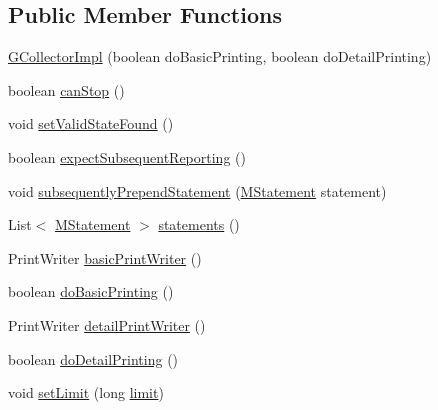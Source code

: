 \subsection*{Public Member Functions}
\begin{DoxyCompactItemize}
\item 
\hyperlink{classorg_1_1tzi_1_1use_1_1gen_1_1tool_1_1_g_collector_impl_a543fa2285c99b149a3c024f5f76da29e}{G\-Collector\-Impl} (boolean do\-Basic\-Printing, boolean do\-Detail\-Printing)
\item 
boolean \hyperlink{classorg_1_1tzi_1_1use_1_1gen_1_1tool_1_1_g_collector_impl_a067c60dd71ba25e508d2b4e5567487fb}{can\-Stop} ()
\item 
void \hyperlink{classorg_1_1tzi_1_1use_1_1gen_1_1tool_1_1_g_collector_impl_ab190695bb90c99d60105c8c1d056e79e}{set\-Valid\-State\-Found} ()
\item 
boolean \hyperlink{classorg_1_1tzi_1_1use_1_1gen_1_1tool_1_1_g_collector_impl_a7ef0f7ec17b42c28d9e9beb425f81bef}{expect\-Subsequent\-Reporting} ()
\item 
void \hyperlink{classorg_1_1tzi_1_1use_1_1gen_1_1tool_1_1_g_collector_impl_af86d89b5fb0fc1557deeada439c799ac}{subsequently\-Prepend\-Statement} (\hyperlink{classorg_1_1tzi_1_1use_1_1uml_1_1sys_1_1soil_1_1_m_statement}{M\-Statement} statement)
\item 
List$<$ \hyperlink{classorg_1_1tzi_1_1use_1_1uml_1_1sys_1_1soil_1_1_m_statement}{M\-Statement} $>$ \hyperlink{classorg_1_1tzi_1_1use_1_1gen_1_1tool_1_1_g_collector_impl_a03dffa5335b9c587bad70f7623d73d8d}{statements} ()
\item 
Print\-Writer \hyperlink{classorg_1_1tzi_1_1use_1_1gen_1_1tool_1_1_g_collector_impl_a961cac6117b3493f91884d4e524182c2}{basic\-Print\-Writer} ()
\item 
boolean \hyperlink{classorg_1_1tzi_1_1use_1_1gen_1_1tool_1_1_g_collector_impl_ab7c5fef0ca5d17d8d199dc3a71e98d69}{do\-Basic\-Printing} ()
\item 
Print\-Writer \hyperlink{classorg_1_1tzi_1_1use_1_1gen_1_1tool_1_1_g_collector_impl_a5a192e01ea279f334d1f7db62423767c}{detail\-Print\-Writer} ()
\item 
boolean \hyperlink{classorg_1_1tzi_1_1use_1_1gen_1_1tool_1_1_g_collector_impl_a8072492c93e5865c55fafcf59c9481df}{do\-Detail\-Printing} ()
\item 
void \hyperlink{classorg_1_1tzi_1_1use_1_1gen_1_1tool_1_1_g_collector_impl_a9d98bbfbfeac4fb021dc7b9b15c9ba61}{set\-Limit} (long \hyperlink{classorg_1_1tzi_1_1use_1_1gen_1_1tool_1_1_g_collector_impl_afda25f50ed09e01f9ee09924c496c071}{limit})

\end{DoxyCompactItemize}
